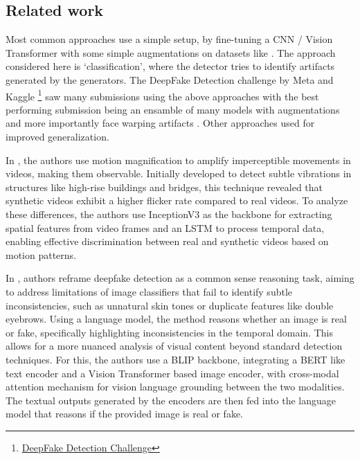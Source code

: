 \documentclass[10pt,twocolumn,letterpaper]{article}
\begin{document}
\subsection{Related work}
Most common approaches use a simple setup, by fine-tuning a CNN / Vision Transformer \cite{dosovitskiyImageWorth16x162021} with some simple augmentations on datasets like \cite{dolhanskyDeepFakeDetectionChallenge2020, rosslerFaceForensicsLargescaleVideo2018, zhengBreakingSemanticArtifacts2024, liCelebDFLargeScaleChallenging2020}. The approach considered here is `classification', where the detector tries to identify artifacts generated by the generators. The DeepFake Detection challenge by Meta and Kaggle \footnote{\href{https://ai.meta.com/datasets/dfdc/}{DeepFake Detection Challenge}} saw many submissions using the above approaches with the best performing submission \cite{seferbekovDeepfakeDetectionChallenge} being an ensamble of many models with augmentations and more importantly face warping artifacts \cite{liExposingDeepFakeVideos2019}. Other approaches used \cite{yunCutMixRegularizationStrategy2019a, hendrycks*AugMixSimpleData2019, zhangMixupEmpiricalRisk2018a} for improved generalization.

In \cite{feiExposingAIgeneratedVideos2021}, the authors use motion magnification to amplify imperceptible movements in videos, making them observable. Initially developed to detect subtle vibrations in structures like high-rise buildings and bridges, this technique revealed that synthetic videos exhibit a higher flicker rate compared to real videos. To analyze these differences, the authors use InceptionV3 \cite{szegedyRethinkingInceptionArchitecture2015} as the backbone for extracting spatial features from video frames and an LSTM \cite{hochreiterLongShortTermMemory1997} to process temporal data, enabling effective discrimination between real and synthetic videos based on motion patterns.

In \cite{zhangCommonSenseReasoning2025}, authors reframe deepfake detection as a common sense reasoning task, aiming to address limitations of image classifiers that fail to identify subtle inconsistencies, such as unnatural skin tones or duplicate features like double eyebrows. Using a language model, the method reasons whether an image is real or fake, specifically highlighting inconsistencies in the temporal domain. This allows for a more nuanced analysis of visual content beyond standard detection techniques. For this, the authors use a BLIP \cite{liBLIPBootstrappingLanguageImage2022} backbone, integrating a BERT \cite{devlinBERTPretrainingDeep2019} like text encoder and a Vision Transformer \cite{dosovitskiyImageWorth16x162021} based image encoder, with cross-modal attention mechanism for vision language grounding between the two modalities. The textual outputs generated by the encoders are then fed into the language model that reasons if the provided image is real or fake.
\end{document}
